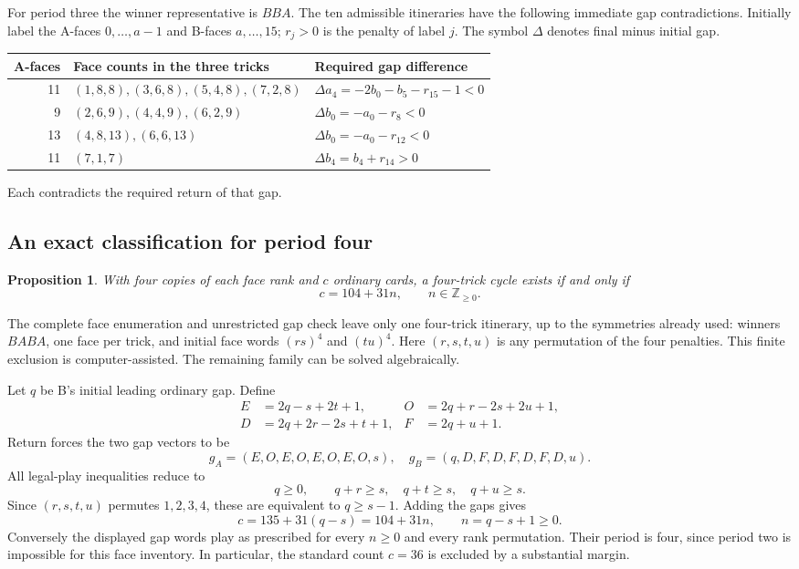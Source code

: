 \documentclass[11pt]{article}
\newtheorem{proposition}{Proposition}
\begin{document}
For period three the winner representative is $BBA$. The ten admissible
itineraries have the following immediate gap contradictions. Initially label
the A-faces $0,\ldots,a-1$ and B-faces $a,\ldots,15$; $r_j>0$ is the penalty
of label $j$. The symbol $\Delta$ denotes final minus initial gap.
\begin{center}
\small
\begin{tabular}{@{}r p{2.35in} l@{}}
\toprule
A-faces & Face counts in the three tricks & Required gap difference\\
\midrule
11 & $(1,8,8),(3,6,8),(5,4,8),(7,2,8)$ & $\Delta a_4=-2b_0-b_5-r_{15}-1<0$\\
9 & $(2,6,9),(4,4,9),(6,2,9)$ & $\Delta b_0=-a_0-r_8<0$\\
13 & $(4,8,13),(6,6,13)$ & $\Delta b_0=-a_0-r_{12}<0$\\
11 & $(7,1,7)$ & $\Delta b_4=b_4+r_{14}>0$\\
\bottomrule
\end{tabular}
\end{center}
Each contradicts the required return of that gap.

\subsection{An exact classification for period four}

\begin{proposition}
With four copies of each face rank and $c$ ordinary cards, a four-trick cycle
exists if and only if
\[
\boxed{c=104+31n,\qquad n\in\mathbb Z_{\ge0}.}
\]
\end{proposition}

The complete face enumeration and unrestricted gap check leave only one
four-trick itinerary, up to the symmetries already used: winners $BABA$, one
face per trick, and initial face words $(rs)^4$ and $(tu)^4$. Here
$(r,s,t,u)$ is any permutation of the four penalties. This finite exclusion
is computer-assisted. The remaining family can be solved algebraically.

Let $q$ be B's initial leading ordinary gap. Define
\[
\begin{aligned}
E&=2q-s+2t+1,& O&=2q+r-2s+2u+1,\\
D&=2q+2r-2s+t+1,& F&=2q+u+1.
\end{aligned}
\]
Return forces the two gap vectors to be
\[
g_A=(E,O,E,O,E,O,E,O,s),\quad
g_B=(q,D,F,D,F,D,F,D,u).
\]
All legal-play inequalities reduce to
\[
q\ge0,\qquad q+r\ge s,\quad q+t\ge s,\quad q+u\ge s.
\]
Since $(r,s,t,u)$ permutes $1,2,3,4$, these are equivalent to $q\ge s-1$.
Adding the gaps gives
\[
c=135+31(q-s)=104+31n,\qquad n=q-s+1\ge0.
\]
Conversely the displayed gap words play as prescribed for every $n\ge0$
and every rank permutation. Their period is four, since period two is
impossible for this face inventory. In particular, the standard count
$c=36$ is excluded by a substantial margin.
\end{document}

